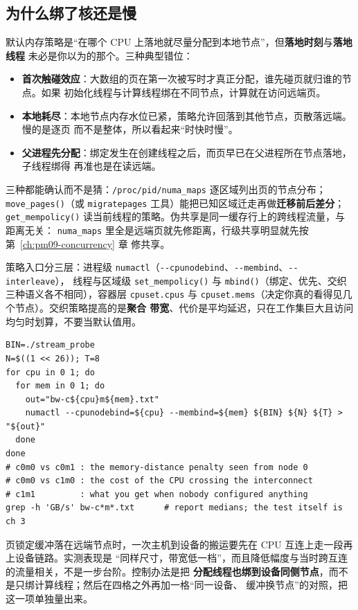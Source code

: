 \documentclass[12pt,a4paper,fontset=fandol]{ctexbook}
\newcommand{\Fn}[1]{\texttt{#1()}}
\newcommand{\Tp}[1]{\texttt{#1}}
\newcommand{\Opt}[1]{\texttt{-\/-#1}}
\newcommand{\Bk}{\discretionary{}{}{}}
\begin{document}
\subsection*{为什么绑了核还是慢}
默认内存策略是``在哪个 CPU 上落地就尽量分配到本地节点''，但\textbf{落地时刻}与\textbf{落地线程}
未必是你以为的那个。三种典型错位：
\begin{itemize}
\item \textbf{首次触碰效应}：大数组的页在第一次被写时才真正分配，谁先碰页就归谁的节点。如果
  初始化线程与计算线程绑在不同节点，计算就在访问远端页。
\item \textbf{本地耗尽}：本地节点内存水位已紧，策略允许回落到其他节点，页散落远端。慢的是逐页
  而不是整体，所以看起来``时快时慢''。
\item \textbf{父进程先分配}：绑定发生在创建线程之后，而页早已在父进程所在节点落地，子线程绑得
  再准也是在读远端。
\end{itemize}
三种都能确认而不是猜：\Tp{/proc/{\Bk}pid{\Bk}/numa{\Bk}\_maps} 逐区域列出页的节点分布；
\Fn{move{\Bk}\_pages}（或 \Tp{migratepages} 工具）能把已知区域迁走再做\textbf{迁移前后差分}；
\Fn{get{\Bk}\_mempolicy} 读当前线程的策略。伪共享是同一缓存行上的跨线程流量，与距离无关：
\Tp{numa{\Bk}\_maps} 里全是远端页就先修距离，行级共享明显就先按第~\ref{ch:pm09-concurrency} 章
修共享。

策略入口分三层：进程级 \Tp{numactl}（\Opt{cpunodebind}、\Opt{membind}、\Opt{interleave}），
线程与区域级 \Fn{set{\Bk}\_mempolicy} 与 \Fn{mbind}（绑定、优先、交织三种语义各不相同），容器层
\Tp{cpuset.cpus} 与 \Tp{cpuset.mems}（决定你真的看得见几个节点）。交织策略提高的是\textbf{聚合
带宽}、代价是平均延迟，只在工作集巨大且访问均匀时划算，不要当默认值用。

\begin{lstlisting}[style=shellstyle,caption={四格对照实验：同一二进制在两种 CPU 绑定与两种内存落点下各跑一遍；远端代价是比值不是绝对值},label={lst:pm12-numa}]
BIN=./stream_probe
N=$((1 << 26)); T=8
for cpu in 0 1; do
  for mem in 0 1; do
    out="bw-c${cpu}m${mem}.txt"
    numactl --cpunodebind=${cpu} --membind=${mem} ${BIN} ${N} ${T} > "${out}"
  done
done
# c0m0 vs c0m1 : the memory-distance penalty seen from node 0
# c0m0 vs c1m0 : the cost of the CPU crossing the interconnect
# c1m1         : what you get when nobody configured anything
grep -h 'GB/s' bw-c*m*.txt      # report medians; the test itself is ch 3
\end{lstlisting}

\begin{note}[title={设备侧的 NUMA 账要一起记}]
页锁定缓冲落在远端节点时，一次主机到设备的搬运要先在 CPU 互连上走一段再上设备链路。实测表现是
``同样尺寸，带宽低一档''，而且降低幅度与当时跨互连的流量相关，不是一步台阶。控制办法是把
\textbf{分配线程也绑到设备同侧节点}，而不是只绑计算线程；然后在四格之外再加一格``同一设备、
缓冲换节点''的对照，把这一项单独量出来。
\end{note}
\end{document}
